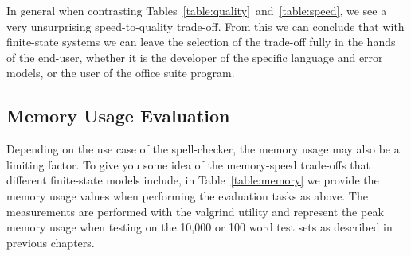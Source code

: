 \documentclass[a4paper,12pt]{article}
\begin{document}
In general when contrasting
Tables~\ref{table:quality}~and~\ref{table:speed}, we see a very unsurprising
speed-to-quality trade-off. From this we can conclude that with finite-state
systems we can leave the selection of the trade-off fully in the hands of
the end-user, whether it is the developer of the specific language and error
models, or the user of the office suite program.

%

\subsection{Memory Usage Evaluation}

Depending on the use case of the spell-checker, the memory usage may also be a
limiting factor. To give you some idea of the memory-speed trade-offs that
different finite-state models include, in Table~\ref{table:memory} we provide
the memory usage values when performing the evaluation tasks as above. The
measurements are performed with the valgrind utility and represent the peak
memory usage when testing on the 10,000 or 100 word test sets as described in
previous chapters.
\end{document}
